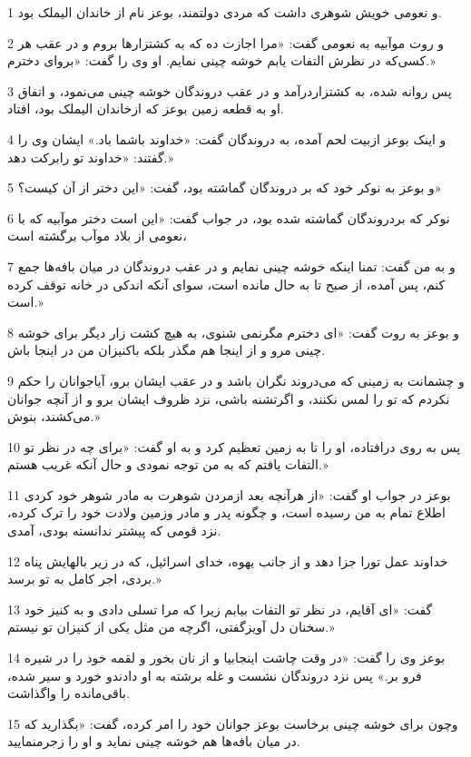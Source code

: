 \par 1 و نعومی خویش شوهری داشت که مردی دولتمند، بوعز نام از خاندان الیملک بود.
\par 2 و روت موآبیه به نعومی گفت: «مرا اجازت ده که به کشتزارها بروم و در عقب هر کسی‌که در نظرش التفات یابم خوشه چینی نمایم. او وی را گفت: «برو‌ای دخترم.»
\par 3 پس روانه شده، به کشتزاردرآمد و در عقب دروندگان خوشه چینی می‌نمود، و اتفاق او به قطعه زمین بوعز که ازخاندان الیملک بود، افتاد.
\par 4 و اینک بوعز ازبیت لحم آمده، به دروندگان گفت: «خداوند باشما باد.» ایشان وی را گفتند: «خداوند تو رابرکت دهد.»
\par 5 و بوعز به نوکر خود که بر دروندگان گماشته بود، گفت: «این دختر از آن کیست؟»
\par 6 نوکر که بردروندگان گماشته شده بود، در جواب گفت: «این است دختر موآبیه که با نعومی از بلاد موآب برگشته است،
\par 7 و به من گفت: تمنا اینکه خوشه چینی نمایم و در عقب دروندگان در میان بافه‌ها جمع کنم، پس آمده، از صبح تا به حال مانده است، سوای آنکه اندکی در خانه توقف کرده است.»
\par 8 و بوعز به روت گفت: «ای دخترم مگرنمی شنوی، به هیچ کشت زار دیگر برای خوشه چینی مرو و از اینجا هم مگذر بلکه باکنیزان من در اینجا باش.
\par 9 و چشمانت به زمینی که می‌دروند نگران باشد و در عقب ایشان برو، آیاجوانان را حکم نکردم که تو را لمس نکنند، و اگرتشنه باشی، نزد ظروف ایشان برو و از آنچه جوانان می‌کشند، بنوش.»
\par 10 پس به روی درافتاده، او را تا به زمین تعظیم کرد و به او گفت: «برای چه در نظر تو التفات یافتم که به من توجه نمودی و حال آنکه غریب هستم.»
\par 11 بوعز در جواب او گفت: «از هر‌آنچه بعد ازمردن شوهرت به مادر شوهر خود کردی اطلاع تمام به من رسیده است، و چگونه پدر و مادر وزمین ولادت خود را ترک کرده، نزد قومی که پیشتر ندانسته بودی، آمدی.
\par 12 خداوند عمل تورا جزا دهد و از جانب یهوه، خدای اسرائیل، که در زیر بالهایش پناه بردی، اجر کامل به تو برسد.»
\par 13 گفت: «ای آقایم، در نظر تو التفات بیابم زیرا که مرا تسلی دادی و به کنیز خود سخنان دل آویزگفتی، اگر‌چه من مثل یکی از کنیزان تو نیستم.»
\par 14 بوعز وی را گفت: «در وقت چاشت اینجابیا و از نان بخور و لقمه خود را در شیره فرو بر.» پس نزد دروندگان نشست و غله برشته به او دادندو خورد و سیر شده، باقی‌مانده را واگذاشت.
\par 15 وچون برای خوشه چینی برخاست بوعز جوانان خود را امر کرده، گفت: «بگذارید که در میان بافه‌ها هم خوشه چینی نماید و او را زجرمنمایید.
